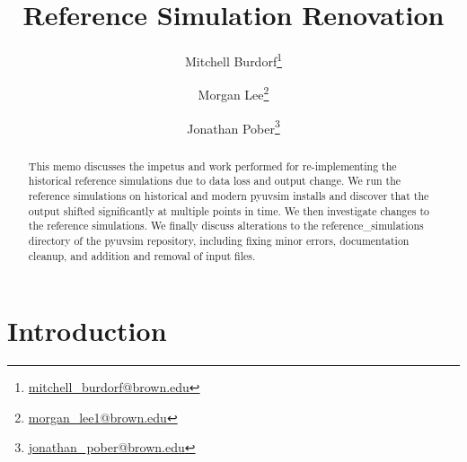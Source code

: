 \documentclass[]{article}
\begin{document}
%
\title{\vspace{-1.5cm}Reference Simulation Renovation}

\author{
  Mitchell Burdorf\footnote{\href{mailto:mitchell_burdorf@brown.edu}{mitchell\_burdorf@brown.edu}}
  \and
  Morgan Lee\footnote{\href{mailto:morgan_lee1@brown.edu}{morgan\_lee1@brown.edu}}
  \and
  Jonathan Pober\footnote{\href{mailto:jonathan_pober@brown.edu}{jonathan\_pober@brown.edu}}
}

\maketitle
\vspace{-0.8cm}
\begin{abstract}
This memo discusses the impetus and work performed for re-implementing the historical reference simulations due to data loss and output change. We run the reference simulations on historical and modern pyuvsim installs and discover that the output shifted significantly at multiple points in time. We then investigate changes to the reference simulations. We finally discuss alterations to the reference\_simulations directory of the pyuvsim repository, including fixing minor errors, documentation cleanup, and addition and removal of input files.
\end{abstract}

\section{Introduction}
\end{document}
